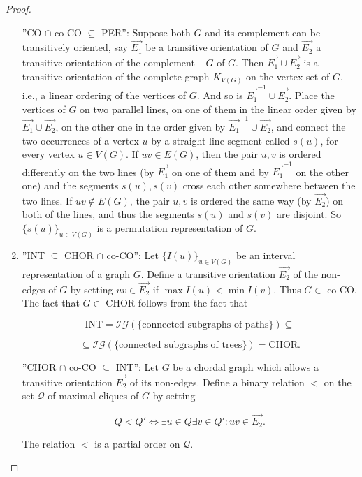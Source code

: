 \begin{proof}
\begin{enumerate}
		”CO $\cap$ co-CO $\subseteq$ PER”: Suppose both $G$ and its complement can be transitively oriented, say $\overrightarrow{E_1}$ be a transitive orientation of $G$ and $\overrightarrow{E_2}$ a transitive orientation of the complement $-G$ of $G$. Then $\overrightarrow{E_1} \cup \overrightarrow{E_2}$ is a transitive orientation of the complete graph $K_{V(G)}$ on the vertex set of $G$, i.e., a linear ordering of the vertices of $G$. And so is $\overrightarrow{E_1}^{-1} \cup \overrightarrow{E_2}$. Place the vertices of $G$ on two parallel lines, on one of them in the linear order given by $\overrightarrow{E_1} \cup \overrightarrow{E_2}$, on the other one in the order given by $\overrightarrow{E_1}^{-1} \cup \overrightarrow{E_2}$, and connect the two occurrences of a vertex $u$ by a straight-line segment called $s(u)$, for every vertex $u \in V(G)$. If $uv \in E(G)$, then the pair $u, v$ is ordered differently on the two lines (by $\overrightarrow{E_1}$ on one of them and by $\overrightarrow{E_1}^{-1}$ on the other one) and the segments $s(u), s(v)$ cross each other somewhere between	the two lines. If $uv \notin E(G)$, the pair $u, v$ is ordered the same way (by $\overrightarrow{E_2}$) on both of the lines, and thus the segments $s(u)$ and $s(v)$ are disjoint. So $\{s(u)\}_{u \in V(G)}$ is a permutation representation of $G$.
		
		\item ”INT $\subseteq$ CHOR $\cap$ co-CO”: Let $\{I(u)\}_{u \in V(G)}$ be an interval representation of a graph $G$. Define a transitive orientation $\overrightarrow{E_2}$ of the non-edges of $G$ by setting $uv \in \overrightarrow{E_2}$ if $\max I(u) < \min I(v)$. Thus $G \in$ co-CO. The fact that $G \in$ CHOR follows from the fact that
		
		$$
		\text{INT} = \mathcal{IG}(\{\text{connected subgraphs of paths}\}) \subseteq
		$$
		
		$$
		\subseteq \mathcal{IG}(\{\text{connected subgraphs of trees}\}) = \text{CHOR}.
		$$
		
		”CHOR $\cap$ co-CO $\subseteq$ INT”: Let $G$ be a chordal graph which allows a transitive orientation $\overrightarrow{E_2}$ of its non-edges. Define a binary relation $<$ on the set $\mathcal{Q}$ of maximal cliques of $G$ by setting
		
		$$
		Q < Q' \Leftrightarrow \exists u \in Q \exists v \in Q' : uv \in \overrightarrow{E_2}.
		$$
		
		\begin{claim}
			The relation $<$ is a partial order on $\mathcal{Q}$.
		\end{claim}
		

\end{enumerate}
\end{proof}
